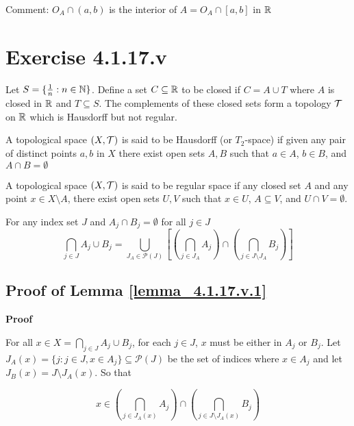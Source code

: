 \documentclass{article}
\begin{document}
Comment: $O_A \cap (a, b)$ is the interior of $A = O_A \cap [a, b]$ in $\mathbb{R}$


\section*{Exercise 4.1.17.v}

Let $S = \{ \frac{1}{n}: n \in \mathbb{N}\}$. Define a set $C \subseteq \mathbb{R}$ to be closed if $C = A \cup T$ where $A$ is closed in $\mathbb{R}$ and $T \subseteq S$. The complements of these closed sets form a topology $\mathcal{T}$ on $\mathbb{R}$ which is Hausdorff but not regular.

\begin{definition}
    A topological space $(X, \mathcal{T})$ is said to be Hausdorff (or $T_2$-space) if given any pair of distinct points $a, b$ in $X$ there exist open sets $A, B$ such that $a \in A$, $b \in B$, and $A \cap B = \emptyset$
\end{definition}

\begin{definition}
    A topological space $(X, \mathcal{T})$ is said to be regular space if any closed set $A$ and any point $x \in X \setminus A$, there exist open sets $U, V$ such that $x \in U$, $A \subseteq V$, and $U \cap V = \emptyset$.
\end{definition}

\begin{lemma}
\label{lemma_4.1.17.v.1}
For any index set $J$ and $A_j \cap B_j = \emptyset$ for all $j \in J$
$$
    \bigcap_{j \in J} A_j \cup B_j = \bigcup_{J_A \in \mathcal{P}(J)} \left[ \left( \bigcap_{j \in J_A} A_j \right) \cap \left( \bigcap_{j \in J \setminus J_A}  B_j \right) \right]
$$
\end{lemma}

\subsection*{Proof of Lemma \ref{lemma_4.1.17.v.1}}

\textbf{Proof}

For all $x \in X = \bigcap_{j \in J} A_j \cup B_j$, for each $j\in J$, $x$ must be either in $A_j$ or $B_j$. Let $J_A(x) = \{ j: j \in J, x \in A_j \} \subseteq \mathcal{P}(J)$ be the set of indices where $x \in A_j$ and let $J_B(x) = J \setminus J_A(x)$. So that

$$
    x \in \left( \bigcap_{j \in J_A(x)} A_j \right) \cap \left( \bigcap_{j \in J \setminus J_A(x)}  B_j \right)
$$
\end{document}
